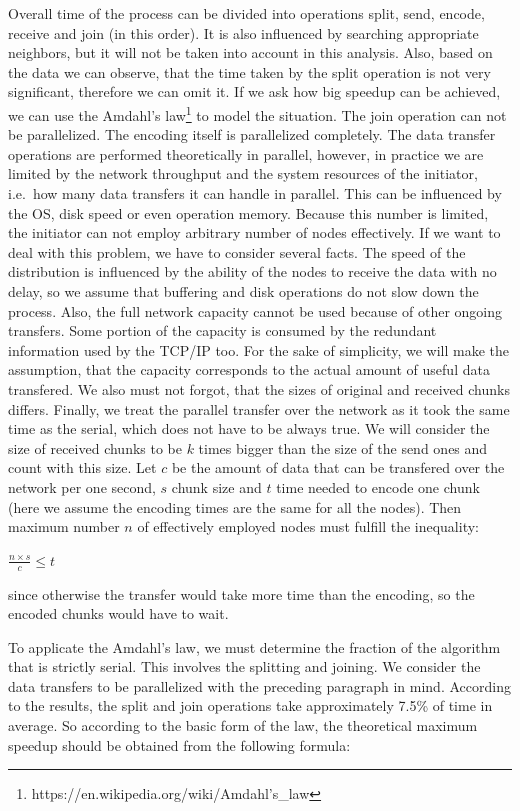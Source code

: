 Overall time of the process can be divided into operations split, send,
encode, receive and join (in this order). It is also influenced by
searching appropriate neighbors, but it will not be taken into account
in this analysis. Also, based on the data we can observe, that the time
taken by the split operation is not very significant, therefore we can
omit it. If we ask how big speedup can be achieved, we can use the
Amdahl's law\footnote{https://en.wikipedia.org/wiki/Amdahl's\_law} to
model the situation. The join operation can not be parallelized. The
encoding itself is parallelized completely. The data transfer operations
are performed theoretically in parallel, however, in practice we are
limited by the network throughput and the system resources of the
initiator, i.e.~how many data transfers it can handle in parallel. This
can be influenced by the OS, disk speed or even operation memory.
Because this number is limited, the initiator can not employ arbitrary
number of nodes effectively. If we want to deal with this problem, we
have to consider several facts. The speed of the distribution is
influenced by the ability of the nodes to receive the data with no
delay, so we assume that buffering and disk operations do not slow down
the process. Also, the full network capacity cannot be used because of
other ongoing transfers. Some portion of the capacity is consumed by the
redundant information used by the TCP/IP too. For the sake of
simplicity, we will make the assumption, that the capacity corresponds
to the actual amount of useful data transfered. We also must not forgot,
that the sizes of original and received chunks differs. Finally, we
treat the parallel transfer over the network as it took the same time as
the serial, which does not have to be always true. We will consider the
size of received chunks to be $k$ times bigger than the size of the send
ones and count with this size. Let $c$ be the amount of data that can be
transfered over the network per one second, $s$ chunk size and $t$ time
needed to encode one chunk (here we assume the encoding times are the
same for all the nodes). Then maximum number $n$ of effectively employed
nodes must fulfill the inequality:

\begin{center}
$\frac{n \times s}{c} \leq t$
\end{center}

since otherwise the transfer would take more time than the encoding, so
the encoded chunks would have to wait.

To applicate the Amdahl's law, we must determine the fraction of the
algorithm that is strictly serial. This involves the splitting and
joining. We consider the data transfers to be parallelized with the
preceding paragraph in mind. According to the results, the split and
join operations take approximately 7.5\% of time in average. So
according to the basic form of the law, the theoretical maximum speedup
should be obtained from the following formula:

